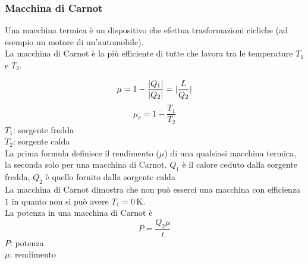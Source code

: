 \subsubsection{Macchina di Carnot}
Una macchina termica è un dispositivo che efettua trasformazioni cicliche (ad esempio un motore
di un'automobile).\\
La macchina di Carnot è la più efficiente di tutte che lavora tra le temperature $T_1$ e $T_2$.
\begin{center}
\end{center}
\begin{equation*}
  \mu = 1-\frac{\lvert Q_1\rvert}{\lvert Q_2\rvert} = \lvert\frac{L}{Q_2}\rvert
\end{equation*}
\begin{equation*}
  \mu_c = 1 - \frac{T_1}{T_2}
\end{equation*}
$T_1$: sorgente fredda\\
$T_2$: sorgente calda\\ [\baselineskip]
La prima formula definisce il rendimento ($\mu$) di una qualsiasi macchina termica, la seconda solo
per una macchina di Carnot. $Q_1$ è il calore ceduto dalla sorgente fredda, $Q_2$ è quello fornito 
dalla sorgente calda\\
La macchina di Carnot dimostra che non può esserci una macchina con efficienza $1$ in quanto non
si può avere $T_1 = 0\,\text{K}$.\\ [\baselineskip]
La potenza in una macchina di Carnot è
\begin{equation*}
  P = \frac{Q_2\mu}{t} 
\end{equation*}
$P$: potenza\\
$\mu$: rendimento

